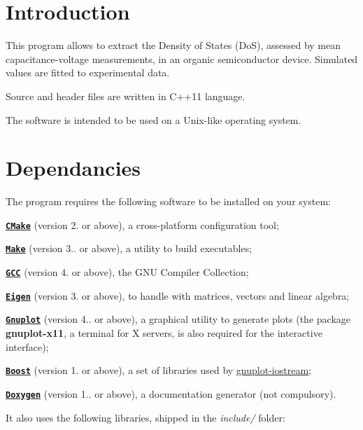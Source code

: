 \hypertarget{index_intro}{}\section{Introduction}\label{index_intro}
This program allows to extract the Density of States (Do\-S), assessed by mean capacitance-\/voltage measurements, in an organic semiconductor device. Simulated values are fitted to experimental data. \par
Source and header files are written in C++11 language. \par
The software is intended to be used on a Unix-\/like operating system.\hypertarget{index_dependancies}{}\section{Dependancies}\label{index_dependancies}
The program requires the following software to be installed on your system\-:

\begin{DoxyItemize}
\item \href{http://www.cmake.org}{\tt {\bfseries C\-Make}} (version 2. or above), a cross-\/platform configuration tool; \item \href{http://www.gnu.org/software/make}{\tt {\bfseries Make}} (version 3.. or above), a utility to build executables; \item \label{index_GCC}%
\hypertarget{index_GCC}{}%
\href{http://www.gnu.org/software/gcc}{\tt {\bfseries G\-C\-C}} (version 4. or above), the G\-N\-U Compiler Collection; \par
 \par
\item \label{index_Eigen}%
\hypertarget{index_Eigen}{}%
\href{http://eigen.tuxfamily.org}{\tt {\bfseries Eigen}} (version 3. or above), to handle with matrices, vectors and linear algebra; \item \label{index_Gnuplot}%
\hypertarget{index_Gnuplot}{}%
\href{http://www.gnuplot.info}{\tt {\bfseries Gnuplot}} (version 4.. or above), a graphical utility to generate plots (the package {\bfseries gnuplot-\/x11}, a terminal for X servers, is also required for the interactive interface); \item \href{http://www.boost.org}{\tt {\bfseries Boost}} (version 1. or above), a set of libraries used by \hyperlink{index_gnuplot-iostream}{gnuplot-\/iostream}; \item \href{http://www.doxygen.org}{\tt {\bfseries Doxygen}} (version 1.. or above), a documentation generator (not compulsory).\end{DoxyItemize}
It also uses the following libraries, shipped in the {\itshape include/} folder\-:


